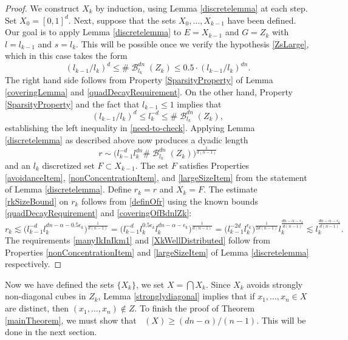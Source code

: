 \documentclass[dvipsnames,letterpaper,12pt]{article}
\numberwithin{equation}{section}
\theoremstyle{plain}
\theoremstyle{remark}
\DeclareMathOperator{\hausdim}{\dim_{\mathbf{H}}}
\DeclareMathOperator{\B}{\mathcal{B}}
\begin{document}
\begin{proof}
	We construct $X_k$ by induction, using Lemma \ref{discretelemma} at each step. Set $X_0=[0,1]^d$. Next, suppose that the sets $X_0, \ldots, X_{k-1}$ have been defined. Our goal is to apply Lemma \ref{discretelemma} to $E = X_{k-1}$ and $G = Z_k$ with $l = l_{k-1}$ and $s = l_k$. This will be possible once we verify the hypothesis \eqref{ZsLarge}, which in this case takes the form
	\begin{equation}
		(l_{k-1}/l_k)^d \leq \#\B_{l_k}^{dn}(Z_k) \leq 0.5 \cdot (l_{k-1}/l_k)^{dn}. \label{need-to-check}
	\end{equation}
	The right hand side follows from Property \ref{SparsityProperty} of Lemma \ref{coveringLemma} and \eqref{quadDecayRequirement}. 	On the other hand, Property \ref{SparsityProperty} and the fact that $l_{k-1} \leq 1$ implies that
	\[ (l_{k-1}/l_k)^d\leq l_{k}^{-d}\leq \#\B_{l_k}^{dn}(Z_k), \]
	establishing the left inequality in \eqref{need-to-check}. Applying Lemma \ref{discretelemma} as described above now produces a dyadic length
	\begin{equation}\label{definOfr}
		r \sim \big(l_{k-1}^{-d}l_k^{dn} \# \B^{dn}_{l_k}(Z_k)\big)^{\frac{1}{d(n-1)}} 
	\end{equation}
	and an $l_k$ discretized set $F \subset X_{k-1}$. The set $F$ satisfies Properties \ref{avoidanceItem}, \ref{nonConcentrationItem}, and \ref{largeSizeItem} from the statement of Lemma \ref{discretelemma}. Define $r_k=r$ and $X_k=F$. The estimate  \eqref{rkSizeBound} on $r_k$ follows from \eqref{definOfr} using the known bounds \eqref{quadDecayRequirement} and \eqref{coveringOfBdnlZk}:
	\[ r_k \lesssim \bigl( l_{k-1}^{-d}  l_k^{dn -\alpha - 0.5 \epsilon_k} \bigr)^{\frac{1}{d(n-1)}} = \bigl( l_{k-1}^{-d} l_k^{0.5 \epsilon_k} l_k^{dn -\alpha - \epsilon_k} \bigr)^{\frac{1}{d(n-1)}} = \bigl( l_{k-1}^{-2d} l_k^{\epsilon_k}\bigr)^{\frac{1}{2d(n-1)}} l_{k}^{\frac{dn-\alpha -\epsilon_k}{d(n-1)}} \lesssim l_{k}^{\frac{dn-\alpha -\epsilon_k}{d(n-1)}}. \]
	The requirements \eqref{manyIkInIkm1} and \eqref{XkWellDistributed} follow from Properties \ref{nonConcentrationItem} and \ref{largeSizeItem} of Lemma \ref{discretelemma} respectively.
\end{proof} 

Now we have defined the sets $\{ X_k \}$, we set $X = \bigcap X_k$. Since $X_k$ avoids strongly non-diagonal cubes in $Z_k$, Lemma \ref{stronglydiagonal} implies that if $x_1, \dots, x_n \in X$ are distinct, then $(x_1, \dots, x_n) \not \in Z$. To finish the proof of Theorem \ref{mainTheorem}, we must show that $\hausdim(X) \geq (dn - \alpha)/(n - 1)$. This will be done in the next section. 
\end{document}
